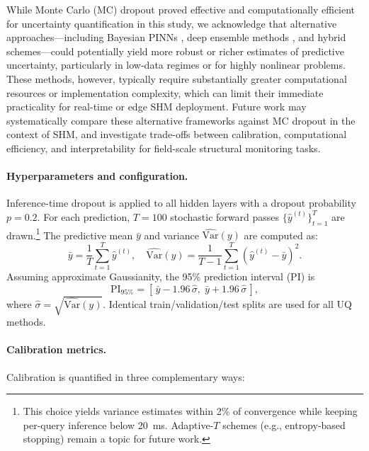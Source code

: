 \documentclass{article}
\begin{document}
While Monte Carlo (MC) dropout proved effective and computationally efficient for uncertainty quantification in this study, we acknowledge that alternative approaches—including Bayesian PINNs \citep{yang2022bpinne}, deep ensemble methods \citep{lakshminarayanan2017simple}, and hybrid schemes—could potentially yield more robust or richer estimates of predictive uncertainty, particularly in low-data regimes or for highly nonlinear problems. These methods, however, typically require substantially greater computational resources or implementation complexity, which can limit their immediate practicality for real-time or edge SHM deployment. Future work may systematically compare these alternative frameworks against MC dropout in the context of SHM, and investigate trade-offs between calibration, computational efficiency, and interpretability for field-scale structural monitoring tasks.

\paragraph{Hyperparameters and configuration.}
Inference-time dropout is applied to all hidden layers with a dropout probability $p=0.2$. 
For each prediction, $T=100$ stochastic forward passes $\{\hat{y}^{(t)}\}_{t=1}^T$ are drawn.\footnote{This choice yields variance estimates within 2\% of convergence while keeping per-query inference below 20~ms. Adaptive-$T$ schemes (e.g., entropy-based stopping) remain a topic for future work.}
The predictive mean $\bar{y}$ and variance $\widehat{\mathrm{Var}}(y)$ are computed as:
\begin{equation}
\bar{y}=\frac{1}{T}\sum_{t=1}^T \hat{y}^{(t)}, \quad
\widehat{\mathrm{Var}}(y)=\frac{1}{T-1}\sum_{t=1}^T (\hat{y}^{(t)}-\bar{y})^2.
\end{equation}
Assuming approximate Gaussianity, the 95\% prediction interval (PI) is
\begin{equation}
\text{PI}_{95\%} = \left[\,\bar{y}-1.96\,\hat{\sigma},\; \bar{y}+1.96\,\hat{\sigma}\,\right],
\end{equation}
where $\hat{\sigma}=\sqrt{\widehat{\mathrm{Var}}(y)}$.
Identical train/validation/test splits are used for all UQ methods.


\paragraph{Calibration metrics.}
Calibration is quantified in three complementary ways:
\end{document}
